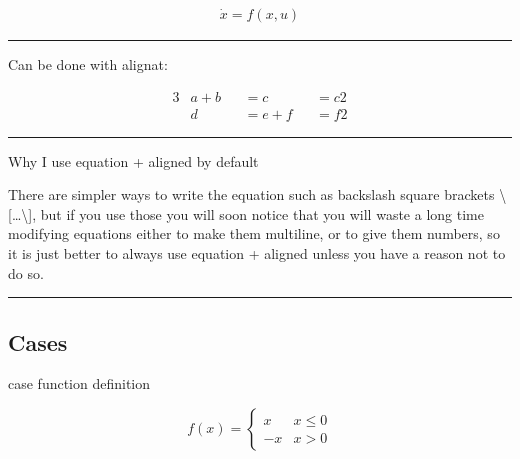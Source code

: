 \documentclass[12pt]{article}
\newcommand{\inOut}[1]{#1}                                %
\begin{document}
    \begin{example} \label{expFor1}

        \inOut{
            \begin{equation}\begin{aligned}\label{eqFor1}
                \dot{x} = f(x,u)
            \end{aligned}\end{equation}
        }

    \end{example}\hrule

    \begin{example} \label{alignMult}

        Can be done with alignat:

        \inOut{
            \begin{alignat*}{3}
                & a + b && = c      && = c2 \\
                & d     && = e + f  && = f2
            \end{alignat*}
        }

    \end{example}\hrule

    \begin{remark}\label{remFor1} Why I use equation + aligned by default

        There are simpler ways to write the equation such as backslash square brackets \textbackslash{}[\ldots\textbackslash{}],
        but if you use those you will soon notice that you will waste a long time modifying equations
        either to make them multiline, or to give them numbers, so it is just better to always use
        equation + aligned unless you have a reason not to do so.

    \end{remark}\hrule

\subsection{Cases}\label{cases}

    case function definition

    \begin{equation}
    f(x) =
    \begin{cases}
        x & x \le 0 \\
        -x & x>0
    \end{cases}
    \end{equation}
\end{document}
